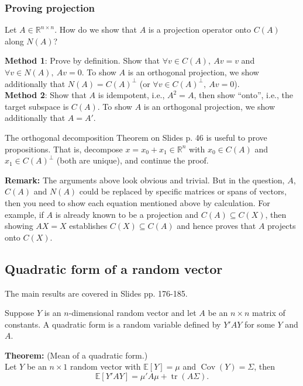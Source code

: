 \documentclass{article}
\newcommand{\blue}{\textcolor{blue}}
\theoremstyle{break}
\newcommand{\R}{\ensuremath{\mathbb{R}}}
\newcommand{\E}{\ensuremath{\mathbb{E}}}
\DeclareMathOperator{\Cov}{Cov}
\DeclareMathOperator{\tr}{tr}
\begin{document}
\subsubsection{Proving projection}
Let $A \in \R^{n \times n}$. How do we show that $A$ is a projection operator onto $C(A)$ along $N(A)$?

\textbf{Method 1}: Prove by definition. Show that $\forall v \in C(A),\ Av = v$ and $\forall v\in N(A),\ Av=  0$. To show $A$ is an orthogonal projection, we show additionally that $N(A) = C(A)^\perp$ (or $\forall v \in C(A)^\perp, \ Av = 0$).\\
\textbf{Method 2}: Show that $A$ is idempotent, i.e., $A^2 = A$, then show ``onto'', i.e., the target subspace is $C(A)$. To show $A$ is an orthogonal projection, we show additionally that $A = A'$.

The orthogonal decomposition Theorem on Slides p. 46 is useful to prove propositions. That is, decompose $x = x_0 + x_1 \in \R^n$ with $x_0 \in C(A)$ and $x_1 \in C(A)^\perp$ (both are unique), and continue the proof.

\textbf{Remark:} The arguments above look obvious and trivial. But in the question, $A$, $C(A)$ and $N(A)$ could be replaced by specific matrices or spans of vectors, then you need to show each equation mentioned above by calculation. For example, if $A$ is already known to be a projection and $C(A)\subseteq C(X)$, then showing $AX=X$ establishes $C(X)\subseteq C(A)$ and hence proves that $A$ projects onto $C(X)$.




\subsection{Quadratic form of a random vector}\label{sec:prelim-lm-quad-form}
The main results are covered in Slides pp. 176-185.

Suppose $Y$ is an $n$-dimensional random vector and let $A$ be an $n \times n$ matrix of constants. A quadratic form is a random variable defined by $Y'AY$ for some $Y$ and $A$.

\textbf{Theorem:} (Mean of a quadratic form.)\\
Let $Y$ be an $n \times 1$ random vector with $\E[Y] = \mu$ and $\Cov(Y) = \Sigma$, then
\[
\E[Y'AY] = \mu' A \mu + \tr(A\Sigma).
\]
\end{document}
